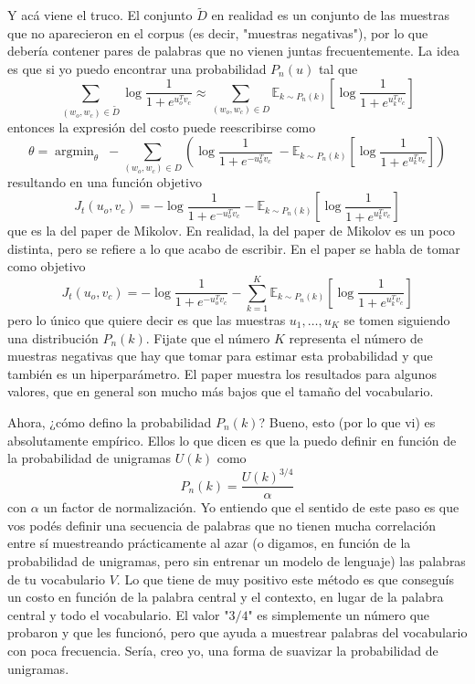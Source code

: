 \documentclass[12pt]{article}
\DeclareMathOperator*{\argmin}{argmin}
\begin{document}
Y acá viene el truco. El conjunto $\tilde{D}$ en realidad es un conjunto de las muestras que no aparecieron en el corpus (es decir, "muestras negativas"), por lo que debería contener pares de palabras que no vienen juntas frecuentemente. La idea es que si yo puedo encontrar una probabilidad $P_n(u)$ tal que 
\begin{equation}
\sum_{(w_o,w_c) \in \tilde{D}} \log \frac{1}{1+e^{u_o^Tv_c}} \approx 
\sum_{(w_o,w_c) \in D} \mathbb{E}_{k \sim P_n(k)}\left[\log \frac{1}{1+e^{u_k^Tv_c}}\right]
\end{equation}
entonces la expresión del costo puede reescribirse como
\begin{equation}
\theta = \argmin_\theta \; - \sum_{(w_o,w_c) \in D} \left(\log \frac{1}{1+e^{-u_o^Tv_c}}\; - \mathbb{E}_{k \sim P_n(k)}\left[\log \frac{1}{1+e^{u_k^Tv_c}}\right]\right)
\end{equation}
resultando en una función objetivo
\begin{equation}
J_t(u_o,v_c) = - \log \frac{1}{1+e^{-u_o^Tv_c}} - \mathbb{E}_{k \sim P_n(k)}\left[\log \frac{1}{1+e^{u_k^Tv_c}}\right]
\end{equation}
que es la del paper de Mikolov. En realidad, la del paper de Mikolov es un poco distinta, pero se refiere a lo que acabo de escribir. En el paper se habla de tomar como objetivo
\begin{equation}
J_t(u_o,v_c) = - \log \frac{1}{1+e^{-u_o^Tv_c}} - \sum_{k=1}^K \mathbb{E}_{k \sim P_n(k)}\left[\log \frac{1}{1+e^{u_k^Tv_c}}\right]
\end{equation}
pero lo único que quiere decir es que las muestras $u_1,\ldots,u_K$ se tomen siguiendo una distribución $P_n(k)$. Fijate que el número $K$ representa el número de muestras negativas que hay que tomar para estimar esta probabilidad y que también es un hiperparámetro. El paper muestra los resultados para algunos valores, que en general son mucho más bajos que el tamaño del vocabulario.

Ahora, ¿cómo defino la probabilidad $P_n(k)$? Bueno, esto (por lo que vi) es absolutamente empírico. Ellos lo que dicen es que la puedo definir en función de la probabilidad de unigramas $U(k)$ como 
\begin{equation}
P_n(k) = \frac{U(k)^{3/4}}{\alpha}
\end{equation}
con $\alpha$ un factor de normalización. Yo entiendo que el sentido de este paso es que vos podés definir una secuencia de palabras que no tienen mucha correlación entre sí muestreando prácticamente al azar (o digamos, en función de la probabilidad de unigramas, pero sin entrenar un modelo de lenguaje) las palabras de tu vocabulario $V$. Lo que tiene de muy positivo este método es que conseguís un costo en función de la palabra central y el contexto, en lugar de la palabra central y todo el vocabulario. El valor "$3/4$" es simplemente un número que probaron y que les funcionó, pero que ayuda a muestrear palabras del vocabulario con poca frecuencia. Sería, creo yo, una forma de suavizar la probabilidad de unigramas.
\end{document}
